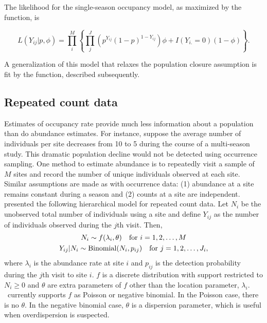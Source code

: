 \documentclass[article,shortnames]{jss}
\DeclareMathOperator{\Bin}{Binomial}
\newcommand{\um}{\pkg{unmarked}}
\begin{document}
The likelihood for the single-season occupancy model, as maximized by the
 function, is

\begin{equation}
L(Y_{ij}| p,\phi) = 
 \prod_{i}^{M} \left\{
    \prod_{j}^{J} 
      \left(p^{Y_{ij}}(1-p)^{1-Y_{ij}}\right)
          \phi + I(Y_{i.}=0)(1-\phi) \right\}. 
\end{equation}

A generalization of this model that relaxes the population closure
assumption is fit by the  function, described subsequently.

\subsection{Repeated count data}
\label{sec:repeated-count-data}

Estimates of occupancy rate provide much less information about a
population than do abundance estimates. For instance, suppose the
average number of individuals per site decreases from 10 to 5 during
the course of a multi-season study. This dramatic population decline
would not be detected using occurrence sampling.  One method to
estimate abundance is to repeatedly visit a sample of $M$ sites and
record the number of unique individuals observed at each site.
Similar assumptions are made as with occurrence data: (1) abundance at
a site remains constant during a season and (2) counts at a site are
independent.  \citet{Royle2004} presented the following hierarchical model for
repeated count data.  Let $N_i$ be the unobserved total number of
individuals using a site and define $Y_{ij}$ as the number of individuals 
observed during the $j$th visit.  Then,
\begin{gather}
  N_i \sim f(\lambda_i, \theta) \text{\quad for $i=1,2,\dots,M$} \label{eq:pc2} \\
  Y_{ij}|N_{i} \sim \Bin(N_i, p_{ij})\text{\quad for $j=1,2,\dots,J_{i}$},
\end{gather}
where $\lambda_i$ is the abundance rate at site $i$ and $p_{ij}$ is
the detection probability during the $j$th visit to site $i$.  $f$ is
a discrete distribution with support restricted to $N_{i} \ge 0$ and
$\theta$ are extra parameters of $f$ other than the location
parameter, $\lambda_{i}$.  \um\ currently supports $f$ as Poisson or
negative binomial.  In the Poisson case, there is no $\theta$.  In the
negative binomial case, $\theta$ is a dispersion parameter, which is
useful when overdispersion is suspected.
\end{document}
